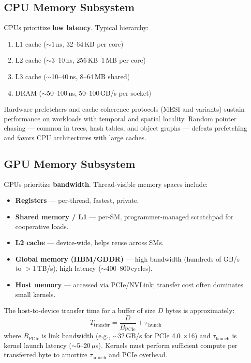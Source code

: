 \documentclass[11pt,journal,onecolumn]{IEEEtran}
\begin{document}
\subsection{CPU Memory Subsystem}
CPUs prioritize \textbf{low latency}. Typical hierarchy:
\begin{enumerate}
    \item L1 cache ($\sim$1\,ns, 32--64\,KB per core)
    \item L2 cache ($\sim$3--10\,ns, 256\,KB--1\,MB per core)
    \item L3 cache ($\sim$10--40\,ns, 8--64\,MB shared)
    \item DRAM ($\sim$50--100\,ns, 50--100\,GB/s per socket)
\end{enumerate}
Hardware prefetchers and cache coherence protocols (MESI and variants) sustain performance on workloads with temporal and spatial locality. Random pointer chasing --- common in trees, hash tables, and object graphs --- defeats prefetching and favors CPU architectures with large caches.

\subsection{GPU Memory Subsystem}
GPUs prioritize \textbf{bandwidth}. Thread-visible memory spaces include:
\begin{itemize}
    \item \textbf{Registers} --- per-thread, fastest, private.
    \item \textbf{Shared memory / L1} --- per-SM, programmer-managed scratchpad for cooperative loads.
    \item \textbf{L2 cache} --- device-wide, helps reuse across SMs.
    \item \textbf{Global memory (HBM/GDDR)} --- high bandwidth (hundreds of GB/s to $>$1\,TB/s), high latency ($\sim$400--800\,cycles).
    \item \textbf{Host memory} --- accessed via PCIe/NVLink; transfer cost often dominates small kernels.
\end{itemize}

The host-to-device transfer time for a buffer of size $D$ bytes is approximately:
\begin{equation}
T_{\mathrm{transfer}} = \frac{D}{B_{\mathrm{PCIe}}} + \tau_{\mathrm{launch}}
\end{equation}
where $B_{\mathrm{PCIe}}$ is link bandwidth (e.g., $\sim$32\,GB/s for PCIe 4.0 $\times$16) and $\tau_{\mathrm{launch}}$ is kernel launch latency ($\sim$5--20\,$\mu$s). Kernels must perform sufficient compute per transferred byte to amortize $\tau_{\mathrm{launch}}$ and PCIe overhead.
\end{document}
